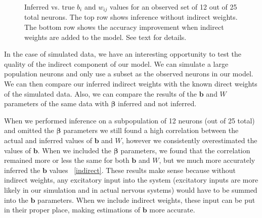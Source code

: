 \documentclass{article}
\newcommand{\figref}[1]{\figurename~\ref{#1}}
\begin{document}
\begin{figure}
{}
\caption{Inferred vs. true $b_i$ and $w_{ij}$ values for an observed set of 12 out of 25 total neurons. The top row shows inference without indirect weights. The bottom row shows the accuracy improvement when indirect weights are added to the model. See text for details.}
\end{figure}
In the case of simulated data, we have an interesting opportunity to test the quality of the indirect component of our model. We can simulate a large population neurons and only use a subset as the observed neurons in our model. We can then compare our inferred indirect weights with the known direct weights of the simulated data. Also, we can compare the results of the $\mathbf{b}$ and $W$ parameters of the same data with $\bm{\beta}$ inferred and not inferred.

When we performed inference on a subpopulation of 12 neurons (out of 25 total) and omitted the $\bm{\beta}$ parameters we still found a high correlation between the actual and inferred values of $\mathbf{b}$ and $W$, however we consistently overestimated the values of $\mathbf{b}$. When we included the $\bm{\beta}$ parameters, we found that the correlation remained more or less the same for both $\mathbf{b}$ and $W$, but we much more accurately inferred the $\mathbf{b}$ values \figref{indirect}. These results make sense because without indirect weights, any excitatory input into the system (excitatory inputs are more likely in our simulation and in actual nervous systems) would have to be summed into the $\mathbf{b}$ parameters. When we include indirect weights, these input can be put in their proper place, making estimations of $\mathbf{b}$ more accurate. 
\end{document}

